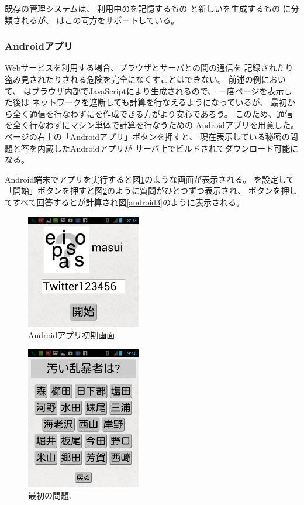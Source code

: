 \documentclass[twoside]{wiss}
\begin{document}
既存の{\PW}管理システムは、
利用中の{\PW}を記憶するもの%
\cite{OnePassword}%
\cite{Dashlane}%
\cite{ミルパス}%
\cite{LastPass}%
\cite{KeyPass}%
\cite{NortonIDSafe}%
\cite{IDManager}%
と新しい{\PW}を生成するもの%
\cite{SuperGenPass}%
に分類されるが、
{\EP}はこの両方をサポートしている。

\subsubsection{Androidアプリ}

Webサービスを利用する場合、ブラウザとサーバとの間の通信を
記録されたり盗み見されたりされる危険を完全になくすことはできない。
前述の例において、
{\PW}はブラウザ内部でJavaScriptにより生成されるので、
一度ページを表示した後は
ネットワークを遮断しても{\PW}計算を行なえるようになっているが、
最初から全く通信を行なわずに{\PW}を作成できる方がより安心であろう。
このため、通信を全く行なわずにマシン単体で{\PW}計算を行なうための
Androidアプリを用意した。
ページの右上の「Androidアプリ」ボタンを押すと、
現在表示している秘密の問題と答を内蔵したAndroidアプリが
サーバ上でビルドされてダウンロード可能になる。

Android端末でアプリを実行すると図\ref{android1}のような画面が表示される。
{\SS}を設定して「開始」ボタンを押すと図\ref{android2}のように質問がひとつずつ表示され、
ボタンを押してすべて回答すると{\PW}が計算され図\ref{android3}のように表示される。

\begin{figure}[H]
\centerline{\includegraphics[width=50mm,bb=0 0 720 720]{figures/android1crop.png}}
\caption{Androidアプリ初期画面.}
\label{android1}
\end{figure}

\begin{figure}[H]
\centerline{\includegraphics[width=50mm,bb=0 0 720 900]{figures/android2crop.png}}
\caption{最初の問題.}
\label{android2}
\end{figure}
\end{document}
